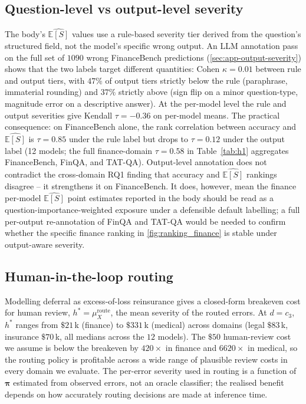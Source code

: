 \documentclass[11pt]{article}
\newcommand{\ES}{\mathbb{E}[S]}
\newcommand{\bpi}{\boldsymbol{\pi}}
\begin{document}
\subsection{Question-level vs output-level severity}

The body's $\widehat{\ES}$ values use a rule-based severity tier
derived from the question's structured field, not the model's
specific wrong output. An LLM annotation pass on the full set of
$1090$ wrong FinanceBench predictions
(\autoref{sec:app-output-severity}) shows that the two labels
target different quantities: Cohen $\kappa = 0.01$ between rule
and output tiers, with $47\%$ of output tiers strictly below the
rule (paraphrase, immaterial rounding) and $37\%$ strictly above
(sign flip on a minor question-type, magnitude error on a
descriptive answer). At the per-model level the rule and output
severities give Kendall $\tau = -0.36$ on per-model means. The
practical consequence: on FinanceBench alone, the rank
correlation between accuracy and $\widehat{\ES}$ is $\tau{=}0.85$
under the rule label but drops to $\tau{=}0.12$ under the
output label (12 models; the full finance-domain
$\tau{=}0.58$ in Table~\ref{tab:h1} aggregates FinanceBench, FinQA,
and TAT-QA). Output-level annotation does not
contradict the cross-domain RQ1 finding that accuracy and
$\widehat{\ES}$ rankings disagree -- it strengthens it on
FinanceBench. It does, however, mean the finance per-model
$\widehat{\ES}$ point estimates reported in the body should be
read as a question-importance-weighted exposure under a
defensible default labelling; a full per-output re-annotation of
FinQA and TAT-QA would be needed to confirm whether the
specific finance ranking in \autoref{fig:ranking_finance} is
stable under output-aware severity.

\subsection{Human-in-the-loop routing}

Modelling deferral as excess-of-loss reinsurance gives a
closed-form breakeven cost for human review,
$h^\ast = \mu_X^{\text{route}}$, the mean severity of the routed
errors. At $d=c_3$, $h^\ast$ ranges from $\$21$\,k (finance) to
$\$331$\,k (medical) across domains (legal $\$83$\,k, insurance
$\$70$\,k, all medians across the $12$ models). The $\$50$
human-review cost we assume is below the breakeven by
$420\times$ in finance and $6620\times$ in medical, so the
routing policy is profitable across a wide range of plausible
review costs in every domain we evaluate. The per-error severity
used in routing is a function of $\bpi$ estimated from observed
errors, not an oracle classifier; the realised benefit depends on
how accurately routing decisions are made at inference time.
\end{document}
